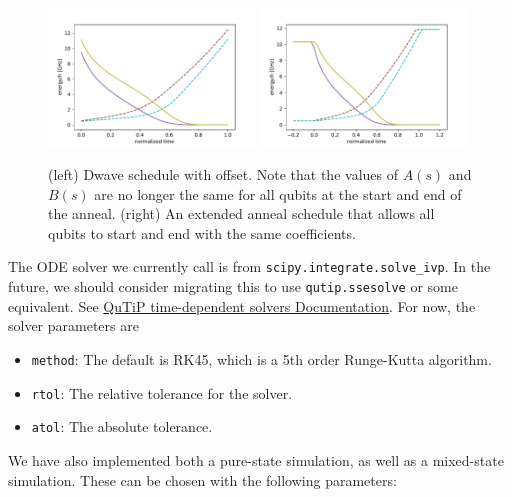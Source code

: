 \documentclass[]{article}
\begin{document}
\begin{figure}[htb]
	\centering
	\includegraphics[width=0.49\textwidth]{coefficient_dwave_offset.pdf}
	\includegraphics[width=0.49\textwidth]{coefficient_dwave_offset_full.pdf}
	\caption{\label{fig:anneal_offset} (left) Dwave schedule with offset. Note that the values of $A(s)$ and $B(s)$ are no longer the same for all qubits at the start and end of the anneal. (right) An extended anneal schedule that allows all qubits to start and end with the same coefficients.
	}
\end{figure}

The ODE solver we currently call is from \texttt{scipy.integrate.solve\_ivp}. In the future, we should consider migrating this to use \texttt{qutip.ssesolve} or some equivalent. See \href{http://qutip.org/docs/latest/guide/dynamics/dynamics-time.html}{QuTiP time-dependent solvers Documentation}. For now, the solver parameters are
\begin{itemize}
	\item \texttt{method}: The default is RK45, which is a 5th order Runge-Kutta algorithm.
	\item \texttt{rtol}: The relative tolerance for the solver.
	\item \texttt{atol}: The absolute tolerance.
\end{itemize}

We have also implemented both a pure-state simulation, as well as a mixed-state simulation.
These can be chosen with the following parameters:
\end{document}

